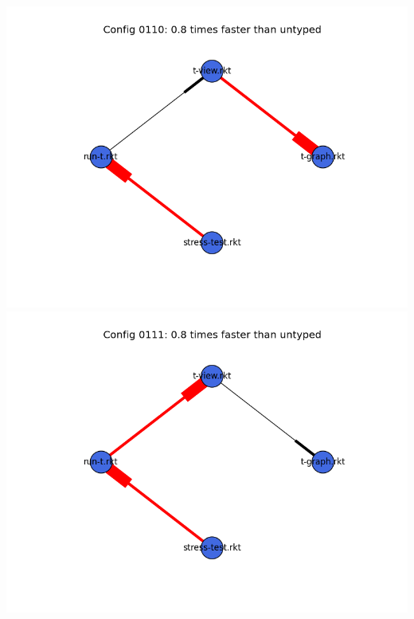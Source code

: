 \documentclass{article}
\begin{document}
\begin{itemize}
\includegraphics[width=\textwidth]{mbta-2015-03-26-module-graph-0110.png}
\includegraphics[width=\textwidth]{mbta-2015-03-26-module-graph-0111.png}
\end{itemize}
\end{document}
